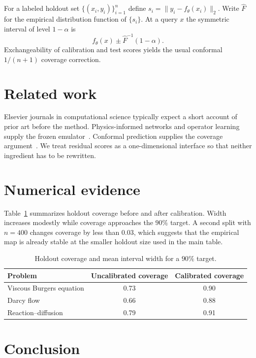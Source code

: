 \documentclass[preprint,12pt]{elsarticle}
\begin{document}
For a labeled holdout set $\{(x_i,y_i)\}_{i=1}^{n}$ define $s_i=\|y_i-f_\theta(x_i)\|_2$. Write $\hat F$ for the empirical distribution function of $\{s_i\}$. At a query $x$ the symmetric interval of level $1-\alpha$ is
\begin{equation}
  f_\theta(x)\pm \hat F^{-1}(1-\alpha).
\end{equation}
Exchangeability of calibration and test scores yields the usual conformal $1/(n+1)$ coverage correction.

\section{Related work}

Elsevier journals in computational science typically expect a short account of prior art before the method. Physics-informed networks and operator learning supply the frozen emulator~\cite{raissi2019}. Conformal prediction supplies the coverage argument~\cite{vovk2005}. We treat residual scores as a one-dimensional interface so that neither ingredient has to be rewritten.

\section{Numerical evidence}

Table~\ref{tab:elsevier-coverage} summarizes holdout coverage before and after calibration. Width increases modestly while coverage approaches the $90\%$ target. A second split with $n=400$ changes coverage by less than $0.03$, which suggests that the empirical map is already stable at the smaller holdout size used in the main table.

\begin{table}[t]
\centering
\caption{Holdout coverage and mean interval width for a $90\%$ target.}
\label{tab:elsevier-coverage}
\begin{tabular}{@{}lcc@{}}
\toprule
Problem & Uncalibrated coverage & Calibrated coverage \\
\midrule
Viscous Burgers equation & 0.73 & 0.90 \\
Darcy flow & 0.66 & 0.88 \\
Reaction--diffusion & 0.79 & 0.91 \\
\bottomrule
\end{tabular}
\end{table}

\section{Conclusion}
\end{document}
